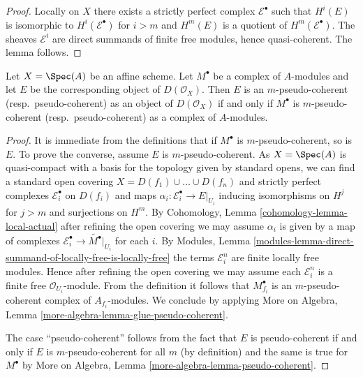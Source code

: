 \begin{proof}
Locally on $X$ there exists a strictly perfect complex $\mathcal{E}^\bullet$
such that $H^i(E)$ is isomorphic to $H^i(\mathcal{E}^\bullet)$ for $i > m$
and $H^m(E)$ is a quotient of $H^m(\mathcal{E}^\bullet)$. The sheaves
$\mathcal{E}^i$ are direct summands of finite free modules,
hence quasi-coherent. The lemma follows.
\end{proof}

\begin{lemma}
\label{lemma-pseudo-coherent-affine}
Let $X = \Spec(A)$ be an affine scheme. Let $M^\bullet$ be a
complex of $A$-modules and let $E$ be the corresponding object
of $D(\mathcal{O}_X)$. Then $E$ is an $m$-pseudo-coherent
(resp.\ pseudo-coherent) as an object of $D(\mathcal{O}_X)$
if and only if $M^\bullet$ is $m$-pseudo-coherent (resp.\ pseudo-coherent)
as a complex of $A$-modules.
\end{lemma}

\begin{proof}
It is immediate from the definitions that if $M^\bullet$ is
$m$-pseudo-coherent, so is $E$. To prove the converse, assume
$E$ is $m$-pseudo-coherent. As $X = \Spec(A)$ is quasi-compact with
a basis for the topology given by standard opens, we can find a standard
open covering $X = D(f_1) \cup \ldots \cup D(f_n)$ and strictly
perfect complexes $\mathcal{E}_i^\bullet$ on $D(f_i)$ and
maps $\alpha_i : \mathcal{E}_i^\bullet \to E|_{U_i}$ inducing
isomorphisms on $H^j$ for $j > m$ and surjections on $H^m$.
By Cohomology, Lemma \ref{cohomology-lemma-local-actual}
after refining the open covering
we may assume $\alpha_i$ is given by a map of complexes
$\mathcal{E}_i^\bullet \to \widetilde{M^\bullet}|_{U_i}$
for each $i$. By Modules, Lemma
\ref{modules-lemma-direct-summand-of-locally-free-is-locally-free}
the terms $\mathcal{E}_i^n$ are finite locally free modules.
Hence after refining the open covering we may assume each
$\mathcal{E}_i^n$ is a finite free $\mathcal{O}_{U_i}$-module.
From the definition it follows that $M^\bullet_{f_i}$ is
an $m$-pseudo-coherent complex of $A_{f_i}$-modules.
We conclude by applying
More on Algebra, Lemma \ref{more-algebra-lemma-glue-pseudo-coherent}.

\medskip\noindent
The case ``pseudo-coherent'' follows from the fact that $E$ is
pseudo-coherent if and only if $E$ is $m$-pseudo-coherent for
all $m$ (by definition) and the same is true for $M^\bullet$
by More on Algebra, Lemma \ref{more-algebra-lemma-pseudo-coherent}.
\end{proof}

